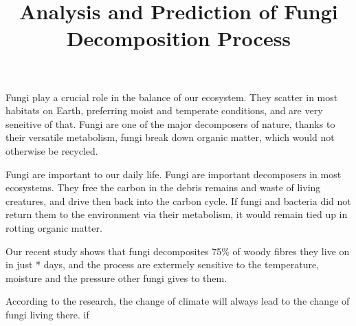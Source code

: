 \documentclass[12pt]{article}
\title{Analysis and Prediction of Fungi Decomposition Process}
\begin{document}
Fungi play a crucial role in the balance of  our ecosystem. They scatter in most habitats on Earth, preferring moist and temperate conditions, and are very seneitive of that. Fungi are one of the major decomposers of nature, thanks to their versatile metabolism, fungi break down organic matter, which would not otherwise be recycled.

Fungi are important to our daily life. Fungi are important decomposers in most ecosystems. They free the carbon in the debris remains and waste of living creatures, and drive then back into the carbon cycle.
If fungi and bacteria did not return them to the environment via their metabolism, it would remain tied up in rotting organic matter.

Our recent study shows that fungi decomposites 75\% of woody fibres they live on in just * days, and the process are extermely sensitive to the temperature, moisture and the pressure other fungi gives to them. 

According to the research, the change of climate will always lead to the change of fungi living there. if 
\end{document}
